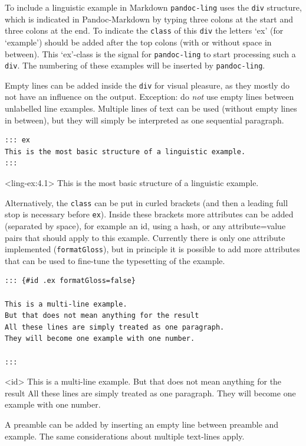 \documentclass[
]{article}
\begin{document}
To include a linguistic example in Markdown \texttt{pandoc-ling} uses
the \texttt{div} structure, which is indicated in Pandoc-Markdown by
typing three colons at the start and three colons at the end. To
indicate the \texttt{class} of this \texttt{div} the letters `ex' (for
`example') should be added after the top colons (with or without space
in between). This `ex'-class is the signal for \texttt{pandoc-ling} to
start processing such a \texttt{div}. The numbering of these examples
will be inserted by \texttt{pandoc-ling}.

Empty lines can be added inside the \texttt{div} for visual pleasure, as
they mostly do not have an influence on the output. Exception: do
\emph{not} use empty lines between unlabelled line examples. Multiple
lines of text can be used (without empty lines in between), but they
will simply be interpreted as one sequential paragraph.

\begin{verbatim}
::: ex
This is the most basic structure of a linguistic example. 
:::
\end{verbatim}

\ex<ling-ex:4.1> 
  This is the most basic structure of a linguistic example.
\xe

Alternatively, the \texttt{class} can be put in curled brackets (and
then a leading full stop is necessary before \texttt{ex}). Inside these
brackets more attributes can be added (separated by space), for example
an id, using a hash, or any attribute=value pairs that should apply to
this example. Currently there is only one attribute implemented
(\texttt{formatGloss}), but in principle it is possible to add more
attributes that can be used to fine-tune the typesetting of the example.

\begin{verbatim}
::: {#id .ex formatGloss=false}

This is a multi-line example.
But that does not mean anything for the result
All these lines are simply treated as one paragraph.
They will become one example with one number.

:::
\end{verbatim}

\ex<id> 
  This is a multi-line example. But that does not mean anything for the
result All these lines are simply treated as one paragraph. They will
become one example with one number.
\xe

A preamble can be added by inserting an empty line between preamble and
example. The same considerations about multiple text-lines apply.
\end{document}
